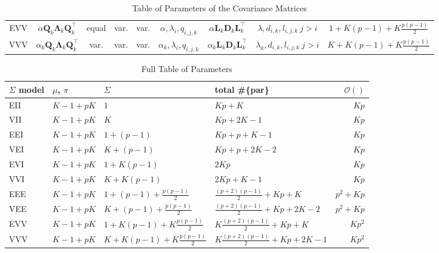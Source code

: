 \begin{table}[!htb]
{\begin{tabular}{| c | c c c c c | c c c |}
            \hline
            EVV    & $ \alpha \pmb{Q}_k \pmb{\Lambda}_k \pmb{Q}_k^\top $ & equal & var. & var. & $ \alpha, \lambda_{i}, q_{i,j,k} $ & $ \alpha \pmb{L}_k \pmb{D}_k \pmb{L}_k^\top $ & $ \lambda, d_{i,k}, l_{i,j,k}\ j>i $ & $ 1+K(p-1)+K\frac{p(p-1)}{2} $  \\
            VVV    & $ \alpha_k \pmb{Q}_k \pmb{\Lambda}_k \pmb{Q}_k^\top $ & var. & var. & var. & $ \alpha_k, \lambda_{i}, q_{i,j,k} $ & $ \alpha_k \pmb{L}_k \pmb{D}_k \pmb{L}_k^\top $ & $ \lambda_k, d_{i,k}, l_{i,j,k}\ j>i $ & $ K+K(p-1)+K\frac{p(p-1)}{2} $ \\
            \hline
        \end{tabular}
    }
    \caption{Table of Parameters of the Covariance Matrices}
    \label{table:paramSigma}
\end{table}

\clearpage

\begin{table}
    \centering
    \begin{tabular}{l|l l|l|r}
        $\Sigma$ model  & $\mu$, $\pi$  & $\Sigma$      & total \#\{par\}       & $\mathcal{O}()$ \\
        \hline
        EII        & $ K -1 + pK$  & $1$                        & $Kp+K$                & $Kp$ \\
        VII        & $ K -1 + pK$  & $K$                        & $Kp+2K-1$             & $Kp$ \\
        EEI        & $ K -1 + pK$  & $1+(p-1)$                  & $Kp+p+K-1$            & $Kp$ \\
        VEI        & $ K -1 + pK$  & $K+(p-1)$                  & $Kp+p+2K-2$           & $Kp$ \\
        EVI        & $ K -1 + pK$  & $1+K(p-1)$                 & $2Kp$                 & $Kp$ \\
        VVI        & $ K -1 + pK$  & $K+K(p-1)$                 & $2Kp+K-1$             & $Kp$ \\
        EEE        & $ K -1 + pK$  & $1+(p-1)+\frac{p(p-1)}{2}$         & $\frac{(p+2)(p-1)}{2}+Kp+K$    
            & $p^2+Kp$ \\
        VEE        & $ K -1 + pK$  & $K+(p-1)+\frac{p(p-1)}{2}$         & $\frac{(p+2)(p-1)}{2}+Kp+2K-2$  
            & $p^2+Kp$ \\
        EVV        & $ K -1 + pK$  & $1+K(p-1)+K\frac{p(p-1)}{2}$       & $K\frac{(p+2)(p-1)}{2}+Kp+K$       
            & $Kp^2$ \\
        VVV        & $ K -1 + pK$  & $K+K(p-1)+K\frac{p(p-1)}{2}$       & $K\frac{(p+2)(p-1)}{2}+Kp+2K-1$       
            & $Kp^2$ \\
    \end{tabular}
    \caption{Full Table of Parameters}
    \label{table:param}
\end{table}

